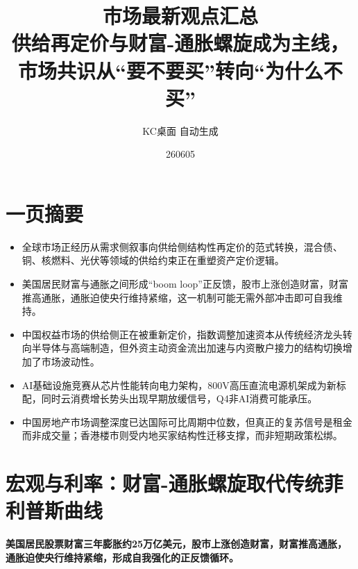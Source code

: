 \documentclass[11pt]{ctexart}
\title{\textbf{市场最新观点汇总}\\[0.4em]{\large 供给再定价与财富-通胀螺旋成为主线，市场共识从“要不要买”转向“为什么不买”}}
\author{KC桌面 自动生成}
\date{260605}
\begin{document}
\maketitle
\tableofcontents
\newpage
\section{一页摘要}
\begin{itemize}
  \item 全球市场正经历从需求侧叙事向供给侧结构性再定价的范式转换，混合债、铜、核燃料、光伏等领域的供给约束正在重塑资产定价逻辑。
  \item 美国居民财富与通胀之间形成“boom loop”正反馈，股市上涨创造财富，财富推高通胀，通胀迫使央行维持紧缩，这一机制可能无需外部冲击即可自我维持。
  \item 中国权益市场的供给侧正在被重新定价，指数调整加速资本从传统经济龙头转向半导体与高端制造，但外资主动资金流出加速与内资散户接力的结构切换增加了市场波动性。
  \item AI基础设施竞赛从芯片性能转向电力架构，800V高压直流电源机架成为新标配，同时云消费增长势头出现早期放缓信号，Q4非AI消费可能承压。
  \item 中国房地产市场调整深度已达国际可比周期中位数，但真正的复苏信号是租金而非成交量；香港楼市则受内地买家结构性迁移支撑，而非短期政策松绑。
\end{itemize}
\section{宏观与利率：财富-通胀螺旋取代传统菲利普斯曲线}
\textbf{美国居民股票财富三年膨胀约25万亿美元，股市上涨创造财富，财富推高通胀，通胀迫使央行维持紧缩，形成自我强化的正反馈循环。}
\end{document}
